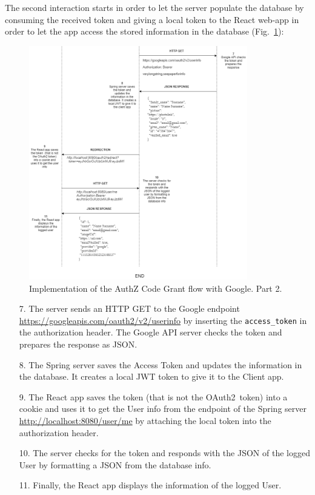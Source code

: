 \documentclass[a4paper,12pt]{article}
\def\oauth{OAuth2\xspace}
\def\myfig#1{Fig.~#1\xspace}
\begin{document}
The second interaction starts in order to let the server populate the database by consuming the received token and giving a local token to the React web-app in order to let the app access the stored information in the database (\myfig{\ref{fig:google2}}):

\begin{figure}[ht]
    \centering
    \includegraphics[width=0.85\textwidth]{figures/flow_google2.png}
    \caption{Implementation of the AuthZ Code Grant flow with Google. Part 2.}
    \label{fig:google2}
\end{figure}

\begin{enumerate}
    \item[7.] The server sends an HTTP GET to the Google endpoint \url{https://googleapis.com/oauth2/v2/userinfo} by inserting the \texttt{access\_token} in the authorization header. The Google API server checks the token and prepares the response as JSON.
    \item[8.] The Spring server saves the Access Token and updates the information in the database. It creates a local JWT token to give it to the Client app.
    \item[9.] The React app saves the token  (that is not the \oauth\ token) into a cookie and uses it to get the User info from the endpoint of the Spring server \url{http://localhost:8080/user/me} by attaching the local token into the authorization header.
    \item[10.] The server checks for the token and responds with the JSON of the logged User by formatting a JSON from the database info.
    \item[11.] Finally, the React app displays the information of the logged User.
\end{enumerate}
\end{document}
